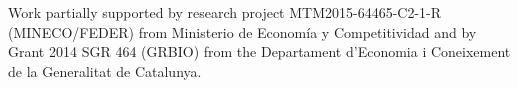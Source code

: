 
\colorbox{qmuldarkblue}
{
 \color{white}
 \parbox{1.0\textwidth}
 {
{\small
	Work partially supported by research project MTM2015-64465-C2-1-R (MINECO/FEDER) from Ministerio de Economía y Competitividad and  by Grant 2014 SGR 464 (GRBIO) from the Departament d'Economia i Coneixement de la Generalitat de Catalunya.  
}
 }
}
